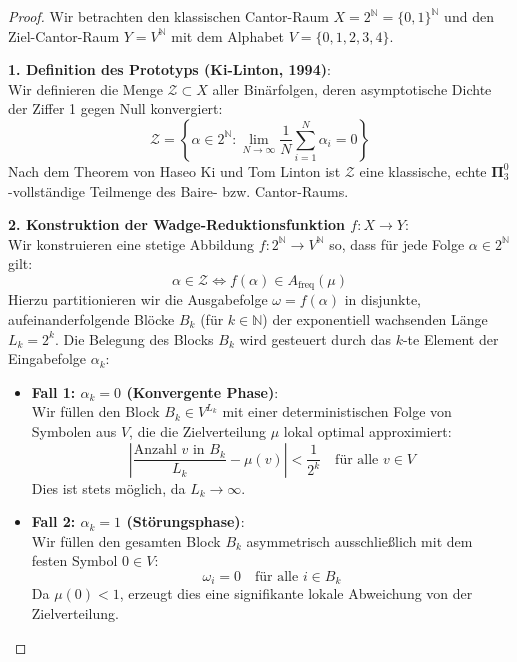 \documentclass[11pt,a4paper]{article}
\numberwithin{equation}{section}
\begin{document}
	\begin{proof}
		Wir betrachten den klassischen Cantor-Raum $X = 2^\mathbb{N} = \{0, 1\}^\mathbb{N}$ und den Ziel-Cantor-Raum $Y = V^\mathbb{N}$ mit dem Alphabet $V = \{0, 1, 2, 3, 4\}$.
		
		\noindent\textbf{1. Definition des Prototyps (Ki-Linton, 1994)}: \\
		Wir definieren die Menge $\mathcal{Z} \subset X$ aller Binärfolgen, deren asymptotische Dichte der Ziffer 1 gegen Null konvergiert:
		\begin{equation}
			\mathcal{Z} = \left\{ \alpha \in 2^\mathbb{N} : \lim_{N \to \infty} \frac{1}{N} \sum_{i=1}^N \alpha_i = 0 \right\}
		\end{equation}
		Nach dem Theorem von Haseo Ki und Tom Linton ist $\mathcal{Z}$ eine klassische, echte $\mathbf{\Pi}^0_3$-vollständige Teilmenge des Baire- bzw. Cantor-Raums.
		
		\noindent\textbf{2. Konstruktion der Wadge-Reduktionsfunktion $f: X \to Y$}: \\
		Wir konstruieren eine stetige Abbildung $f: 2^\mathbb{N} \to V^\mathbb{N}$ so, dass für jede Folge $\alpha \in 2^\mathbb{N}$ gilt:
		\begin{equation}
			\alpha \in \mathcal{Z} \iff f(\alpha) \in A_{\mathrm{freq}}(\mu)
		\end{equation}
		Hierzu partitionieren wir die Ausgabefolge $\omega = f(\alpha)$ in disjunkte, aufeinanderfolgende Blöcke $B_k$ (für $k \in \mathbb{N}$) der exponentiell wachsenden Länge $L_k = 2^k$. Die Belegung des Blocks $B_k$ wird gesteuert durch das $k$-te Element der Eingabefolge $\alpha_k$:
		\begin{itemize}
			\item \textbf{Fall 1: $\alpha_k = 0$ (Konvergente Phase)}: \\
			Wir füllen den Block $B_k \in V^{L_k}$ mit einer deterministischen Folge von Symbolen aus $V$, die die Zielverteilung $\mu$ lokal optimal approximiert:
			\begin{equation}
				\left| \frac{\text{Anzahl } v \text{ in } B_k}{L_k} - \mu(v) \right| < \frac{1}{2^k} \quad \text{für alle } v \in V
			\end{equation}
			Dies ist stets möglich, da $L_k \to \infty$.
			\item \textbf{Fall 2: $\alpha_k = 1$ (Störungsphase)}: \\
			Wir füllen den gesamten Block $B_k$ asymmetrisch ausschließlich mit dem festen Symbol $0 \in V$:
			\begin{equation}
				\omega_i = 0 \quad \text{für alle } i \in B_k
			\end{equation}
			Da $\mu(0) < 1$, erzeugt dies eine signifikante lokale Abweichung von der Zielverteilung.
		\end{itemize}
		

\end{proof}
\end{document}
